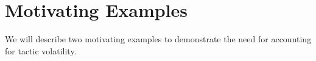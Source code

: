 \documentclass[11pt]{proposalnsf}
\newcommand{\dan}[1]{\textcolor{blue}{{\it [Dan says: #1]}}}
\begin{document}
\begin{sloppypar}













\section{Motivating Examples} 
We will describe two motivating examples to demonstrate the need for accounting for tactic volatility.


\end{sloppypar}
\end{document}
